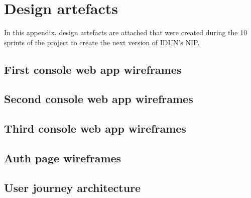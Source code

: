 \chapter{Design artefacts}
\label{appendix5-design-artefacts}

In this appendix, design artefacts are attached that were created during the 10 sprints of the project to create the next version of IDUN’s NIP.

\section*{First console web app wireframes}

\section*{Second console web app wireframes}

\section*{Third console web app wireframes}


\section*{Auth page wireframes}

\section*{User journey architecture}

